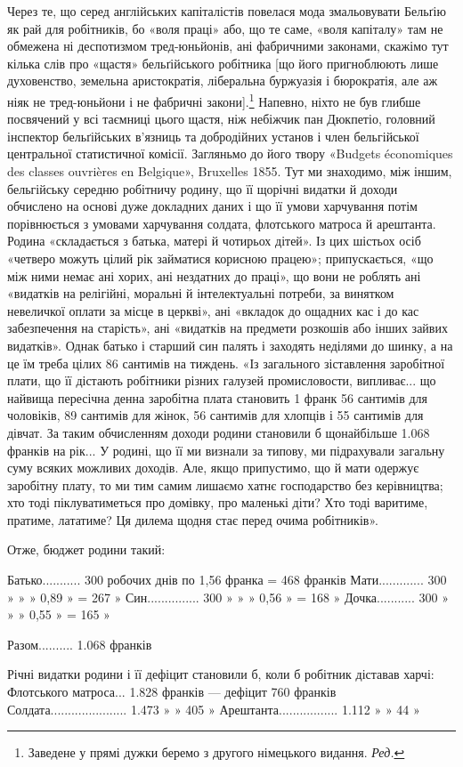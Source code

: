 Через те, що серед англійських капіталістів повелася мода
змальовувати Бельґію як рай для робітників, бо «воля праці»
або, що те саме, «воля капіталу» там не обмежена ні деспотизмом
тред-юньйонів, ані фабричними законами, скажімо тут кілька
слів про «щастя» бельґійського робітника [що його пригноблюють
лише духовенство, земельна аристократія, ліберальна буржуазія
і бюрократія, але аж ніяк не тред-юньйони і не фабричні закони].\footnote*{
Заведене у прямі дужки беремо з другого німецького видання. \emph{Ред.}
}
Напевно, ніхто не був глибше посвячений у всі таємниці
цього щастя, ніж небіжчик пан Дюкпетіо, головний інспектор
бельґійських в’язниць та добродійних установ і член бельгійської
центральної статистичної комісії. Загляньмо до його твору
«Budgets économiques des classes ouvrières en Belgique», Bruxelles
1855. Тут ми знаходимо, між іншим, бельгійську середню
робітничу родину, що її щорічні видатки й доходи обчислено
на основі дуже докладних даних і що її умови харчування потім
порівнюється з умовами харчування солдата, флотського матроса
й арештанта. Родина «складається з батька, матері й чотирьох
дітей». Із цих шістьох осіб «четверо можуть цілий рік займатися
корисною працею»; припускається, «що між ними немає ані
хорих, ані нездатних до праці», що вони не роблять ані «видатків
на релігійні, моральні й інтелектуальні потреби, за винятком
невеличкої оплати за місце в церкві», ані «вкладок до ощадних
кас і до кас забезпечення на старість», ані «видатків на предмети
розкошів або інших зайвих видатків». Однак батько і старший
син палять і заходять неділями до шинку, а на це їм треба цілих
86 сантимів на тиждень. «Із загального зіставлення заробітної
плати, що її дістають робітники різних галузей промисловости,
випливає... що найвища пересічна денна заробітна плата становить
1 франк 56 сантимів для чоловіків, 89 сантимів для жінок,
56 сантимів для хлопців і 55 сантимів для дівчат. За таким обчисленням
доходи родини становили б щонайбільше 1.068 франків
на рік... У родині, що її ми визнали за типову, ми підрахували
загальну суму всяких можливих доходів. Але, якщо припустимо,
що й мати одержує заробітну плату, то ми тим самим
лишаємо хатнє господарство без керівництва; хто тоді піклуватиметься
про домівку, про маленькі діти? Хто тоді варитиме, пратиме,
лататиме? Ця дилема щодня стає перед очима робітників».

Отже, бюджет родини такий:

Батько...........    300 робочих днів по 1,56 франка = 468 франків
Мати.............    300         »         »      »    0,89       »       = 267       »
Син...............    300         »         »      »    0,56       »       = 168       »
Дочка...........     300         »         »      »    0,55       »       = 165       »

                                             Разом.......... 1.068 франків

Річні видатки родини і її дефіцит становили б, коли б робітник
діставав харчі:
Флотського матроса...   1.828 франків — дефіцит 760 франків
Солдата......................   1.473       »                   »         405       »
Арештанта.................   1.112       »                   »          44         »

